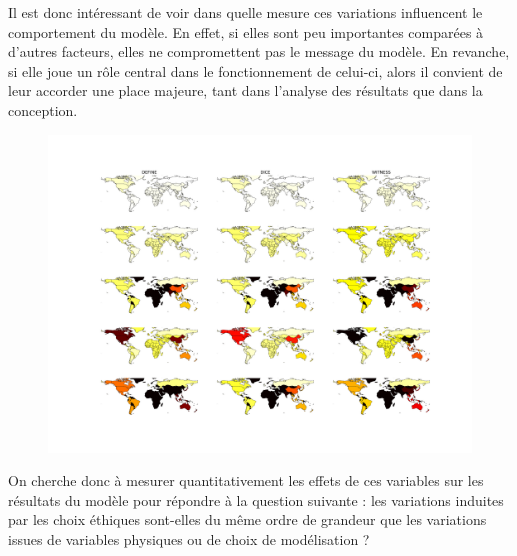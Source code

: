 Il est donc intéressant de voir dans quelle mesure ces variations influencent le comportement du modèle. En effet, si elles sont peu importantes comparées à d'autres facteurs, elles ne compromettent pas le message du modèle. En revanche, si elle joue un rôle central dans le fonctionnement de celui-ci, alors il convient de leur accorder une place majeure, tant dans l'analyse des résultats que dans la conception. 

\begin{figure}
    \centering
    \includegraphics[width=\linewidth]{results/carte_progressive.png}
    \label{fig:carte-progressive}
\end{figure}

On cherche donc à mesurer quantitativement les effets de ces variables sur les résultats du modèle pour répondre à la question suivante : les variations induites par les choix éthiques sont-elles du même ordre de grandeur que les variations issues de variables physiques ou de choix de modélisation ? 



